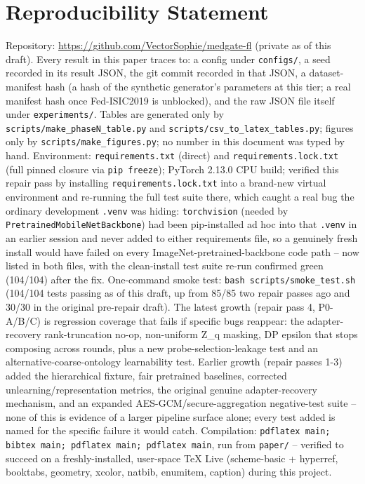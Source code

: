 \documentclass[11pt]{article}
\begin{document}
\section{Reproducibility Statement}
\label{sec:reproducibility}
Repository: \url{https://github.com/VectorSophie/medgate-fl} (private as of
this draft). Every result in this paper traces to: a config under
\texttt{configs/}, a seed recorded in its result JSON, the git commit
recorded in that JSON, a dataset-manifest hash (a hash of the synthetic
generator's parameters at this tier; a real manifest hash once Fed-ISIC2019
is unblocked), and the raw JSON file itself under \texttt{experiments/}.
Tables are generated only by \texttt{scripts/make\_phaseN\_table.py} and
\texttt{scripts/csv\_to\_latex\_tables.py}; figures only by
\texttt{scripts/make\_figures.py}; no number in this document was typed by
hand. Environment: \texttt{requirements.txt} (direct) and
\texttt{requirements.lock.txt} (full pinned closure via \texttt{pip
freeze}); PyTorch 2.13.0 CPU build; verified this repair pass by installing
\texttt{requirements.lock.txt} into a brand-new virtual environment and
re-running the full test suite there, which caught a real bug the ordinary
development \texttt{.venv} was hiding: \texttt{torchvision} (needed by
\texttt{PretrainedMobileNetBackbone}) had been pip-installed ad hoc into
that \texttt{.venv} in an earlier session and never added to either
requirements file, so a genuinely fresh install would have failed on every
ImageNet-pretrained-backbone code path -- now listed in both files, with
the clean-install test suite re-run confirmed green (104/104) after the
fix. One-command smoke test:
\texttt{bash scripts/smoke\_test.sh} (104/104 tests passing as of this
draft, up from 85/85 two repair passes ago and 30/30 in the original
pre-repair draft). The latest growth (repair pass 4, P0-A/B/C) is
regression coverage that fails if specific bugs reappear: the
adapter-recovery rank-truncation no-op, non-uniform Z\_q masking, DP
epsilon that stops composing across rounds, plus a new
probe-selection-leakage test and an alternative-coarse-ontology
learnability test. Earlier growth (repair passes 1-3) added the
hierarchical fixture, fair pretrained baselines, corrected
unlearning/representation metrics, the original genuine adapter-recovery
mechanism, and an expanded AES-GCM/secure-aggregation negative-test suite
-- none of this is evidence of a larger pipeline surface alone; every test
added is named for the specific failure it would catch. Compilation:
\texttt{pdflatex main; bibtex main; pdflatex main;
pdflatex main}, run from \texttt{paper/} -- verified to succeed on a
freshly-installed, user-space TeX Live (scheme-basic + hyperref, booktabs,
geometry, xcolor, natbib, enumitem, caption) during this project.
\end{document}
